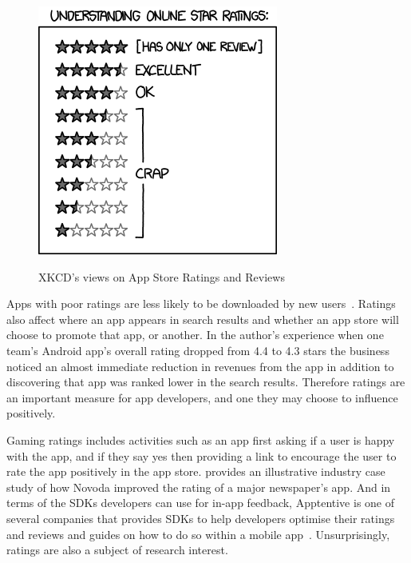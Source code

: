 \begin{figure}[htbp!]
\begin{minipage}{.5\textwidth}
  \centering
  \includegraphics[width=\textwidth]{images/xkcd/star_ratings.png}
  \label{fig:xkcd-star-ratings}
\end{minipage}
    \caption{XKCD's views on App Store Ratings and Reviews}
    \label{fig:xkcd-app-store-ratings}
\end{figure}

Apps with poor ratings are less likely to be downloaded by new users~\citep{dimensionalresearch2015_mobile_app_use_and_abandonment}. Ratings also affect where an app appears in search results and whether an app store will choose to promote that app, or another. In the author's experience when one team's Android app's overall rating dropped from 4.4 to 4.3 stars the business noticed an almost immediate reduction in revenues from the app in addition to discovering that app was ranked lower in the search results. Therefore ratings are an important measure for app developers, and one they may choose to influence positively. 

Gaming ratings includes activities such as an app first asking if a user is happy with the app, and if they say yes then providing a link to encourage the user to rate the app positively in the app store. \citet{novoda_akan2016_asking_for_app_feedback_the_effective_way} provides an illustrative industry case study of how Novoda improved the rating of a major newspaper's app. And in terms of the SDKs developers can use for in-app feedback, Apptentive is one of several companies that provides SDKs to help developers optimise their ratings and reviews and guides on how to do so within a mobile app~\citep{walz2015_apptentive_the_mobile_marketers_guide_to_app_store_ratings_and_reviews}. Unsurprisingly, ratings are also a subject of research interest.

